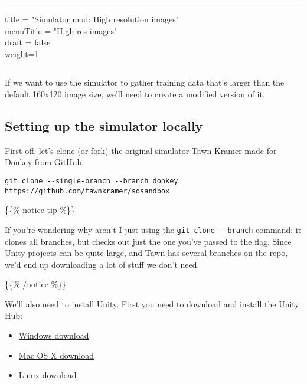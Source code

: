 \documentclass[
]{article}
\author{}
\date{}
\begin{document}
\begin{center}\rule{0.5\linewidth}{0.5pt}\end{center}

title = "Simulator mod: High resolution images"\\
menuTitle = "High res images"\\
draft = false\\
weight=1

\begin{center}\rule{0.5\linewidth}{0.5pt}\end{center}

If we want to use the simulator to gather training data that's larger
than the default 160x120 image size, we'll need to create a modified
version of it.

\hypertarget{header-n5}{%
\subsection{Setting up the simulator locally}\label{header-n5}}

First off, let's clone (or fork)
\href{https://github.com/tawnkramer/sdsandbox/tree/donkey/sdsim}{the
original simulator} Tawn Kramer made for Donkey from GitHub.

\begin{verbatim}
git clone --single-branch --branch donkey https://github.com/tawnkramer/sdsandbox
\end{verbatim}

\{\{\% notice tip \%\}\}

If you're wondering why aren't I just using the
\texttt{git\ clone\ -\/-branch} command: it clones all branches, but
checks out just the one you've passed to the flag. Since Unity projects
can be quite large, and Tawn has several branches on the repo, we'd end
up downloading a lot of stuff we don't need.

\{\{\% /notice \%\}\}

We'll also need to install Unity. First you need to download and install
the Unity Hub:

\begin{itemize}
\item
  \href{https://public-cdn.cloud.unity3d.com/hub/prod/UnityHubSetup.exe}{Windows
  download}
\item
  \href{https://public-cdn.cloud.unity3d.com/hub/prod/UnityHubSetup.dmg}{Mac
  OS X download}
\item
  \href{https://public-cdn.cloud.unity3d.com/hub/prod/UnityHubSetup.AppImage}{Linux
  download}
\end{itemize}
\end{document}
